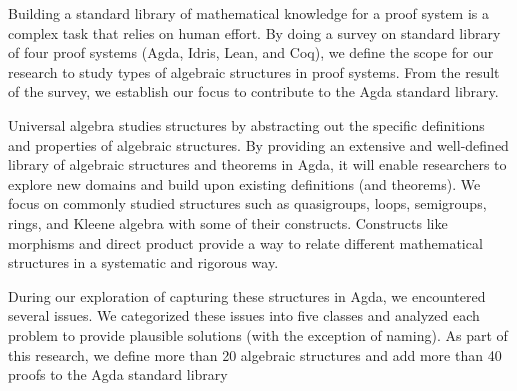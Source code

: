 Building a standard library of mathematical knowledge for a proof system is a
complex task that relies on human effort. By doing a survey on standard library
of four proof systems (Agda, Idris, Lean, and Coq), we define the scope for our
research to study types of algebraic structures in proof systems. From the
result of the survey, we establish our focus to contribute to the Agda standard
library. 

Universal algebra studies structures by abstracting out the specific definitions
and properties of algebraic structures. By providing an extensive and
well-defined library of algebraic structures and theorems in Agda, it will
enable researchers to explore new domains and build upon existing definitions
(and theorems). We focus on commonly studied structures such as quasigroups,
loops, semigroups, rings, and Kleene algebra with some of their constructs.
Constructs like morphisms and direct product provide a way to relate different
mathematical structures in a systematic and rigorous way. 

During our exploration of capturing these structures in Agda, we encountered
several issues. We categorized these issues into five classes and analyzed each
problem to provide plausible solutions (with the exception of naming). As part
of this research, we define more than 20 algebraic structures and add more than
40 proofs to the Agda standard library
